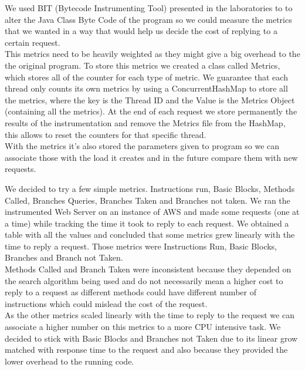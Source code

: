 \documentclass[times, 10pt,twocolumn]{article}
\begin{document}
   We used BIT (Bytecode Instrumenting Tool) presented in the laboratories to 
   to alter the Java Class Byte Code of the program so we could measure the metrics
   that we wanted in a way that would help us decide the cost of replying to a certain request.\\
   This metrics need to be heavily weighted as they might give a big overhead to the 
   the original program. To store this metrics we created a class called Metrics, which
   stores all of the counter for each type of metric. We guarantee that each thread only 
   counts its own metrics by using a ConcurrentHashMap to store all the metrics, where the 
   key is the Thread ID and the Value is the Metrics Object (containing all the metrics). At 
   the end of each request we store permanently the results of the instrumentation and remove
   the Metrics file from the HashMap, this allows to reset the counters for that specific thread.\\
   With the metrics it's also stored the parameters given to program so we can associate those with
   the load it creates and in the future compare them with new requests.


   We decided to try a few simple metrics. Instructions run, Basic Blocks, 
   Methods Called, Branches Queries, Branches Taken and Branches not taken. 
   We ran the instrumented Web Server on an instance of AWS and made some requests 
   (one at a time) while tracking the time it took to reply to each request.
   We obtained a table with all the values and concluded that some metrics grew
   linearly with the time to reply a request. Those metrics were Instructions
   Run, Basic Blocks, Branches and Branch not Taken.\\
   Methods Called and Branch Taken were inconsistent because they depended on 
   the search algorithm being used and do not necessarily mean a higher cost to 
   reply to a request as different methods could have different number of instructions
   which could mislead the cost of the request.\\
   As the other metrics scaled linearly with the time to reply to the request we can
   associate a higher number on this metrics to a more CPU intensive task.
   We decided to stick with Basic Blocks and Branches not Taken due to its 
   linear grow matched with response time to the request and also because they provided
   the lower overhead to the running code. 
\end{document}
